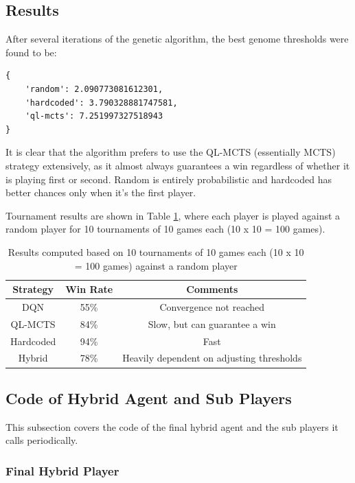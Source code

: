 \subsection{Results}

After several iterations of the genetic algorithm, the best genome thresholds were found to be:

\begin{verbatim}
{
    'random': 2.090773081612301,
    'hardcoded': 3.790328881747581,
    'ql-mcts': 7.251997327518943
}
\end{verbatim}

It is clear that the algorithm prefers to use the QL-MCTS (essentially MCTS) strategy extensively, as it almost always guarantees a win regardless of whether it is playing first or second. Random is entirely probabilistic and hardcoded has better chances only when it's the first player.

Tournament results are shown in Table \ref{results}, where each player is played against a random player for 10 tournaments of 10 games each (10 x 10 = 100 games).

\begin{table}[h]
    \centering
    \begin{tabular}{|c|c|c|}
        \hline
        \textbf{Strategy} & \textbf{Win Rate} & \textbf{Comments} \\ \hline
        DQN & 55\% & Convergence not reached \\ \hline
        QL-MCTS & 84\% & Slow, but can guarantee a win \\ \hline
        Hardcoded & 94\% & Fast \\ \hline
        Hybrid & 78\% & Heavily dependent on adjusting thresholds \\ \hline
    \end{tabular}
    \caption{Results computed based on 10 tournaments of 10 games each (10 x 10 = 100 games) against a random player}
    \label{results}
\end{table}

\subsection{Code of Hybrid Agent and Sub Players}

This subsection covers the code of the final hybrid agent and the sub players it calls periodically.

\subsubsection{Final Hybrid Player}

